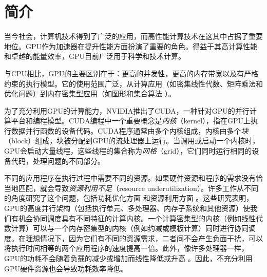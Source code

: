 \chapter{简介}

当今社会，计算机技术得到了广泛的应用，而高性能计算技术在这其中占据了重要地位。GPU作为加速器在提升性能方面扮演了重要的角色。得益于其高计算性能和卓越的能量效率，GPU目前广泛用于科学和技术计算。

与CPU相比，GPU的主要区别在于：更高的并发性，更高的内存带宽以及有严格约束的执行模型。它的使用范围广泛，从计算应用（如密集线性代数\cite{10.5555/1413370.1413402}、矩阵乘法\cite{10.1145/2063384.2063392}和优化问题\cite{6498575}）到内存密集型应用（如图形和集合算法\cite{10.1145/3108139} \cite{10.1145/2560040} \cite{10.1007/978-3-662-53455-7_1}）。

为了充分利用GPU的计算能力，NVIDIA推出了CUDA，一种针对GPU的并行计算平台和编程模型。CUDA编程中一个重要概念是\emph{内核}（kernel），指在GPU上执行数据并行函数的设备代码\cite{kernel-def}。CUDA程序通常由多个内核组成，内核由多个\emph{块}（block）组成，块被分配到GPU的流处理器上运行。当调用或启动一个内核时，GPU会启动大量线程，这些线程的集合称为\emph{网格}（grid），它们同时运行相同的设备代码，处理问题的不同部分。

不同的应用程序在执行过程中需要不同的资源。如果硬件资源和程序的需求没有恰当地匹配，就会导致\emph{资源利用不足}（resource underutilization）。许多工作从不同的角度研究了这个问题，包括功耗优化方面\cite{10.1145/3133560} \cite{10.1145/2611758} \cite{7152947}和资源利用方面\cite{10.1145/3093336.3037707} \cite{7967160}。这些研究表明，GPU的高度并行架构（包括执行单元、多处理器、内存子系统和其他资源）使我们有机会协同调度具有不同特征的计算内核。一个计算密集型的内核（例如线性代数计算）可以与一个内存密集型的内核（例如约减或模板计算）同时进行协同调度。在理想情况下，因为它们有不同的资源需求，二者间不会产生负面干扰，可以将执行时间相等的两个应用程序的速度提高一倍。此外，像许多处理器一样，GPU的功耗不会随着负载的减少或增加而线性降低或升高\cite{10.1145/2636342} \cite{10.1007/s11227-016-1643-9}。因此，不充分利用GPU硬件资源也会导致功耗效率降低。


